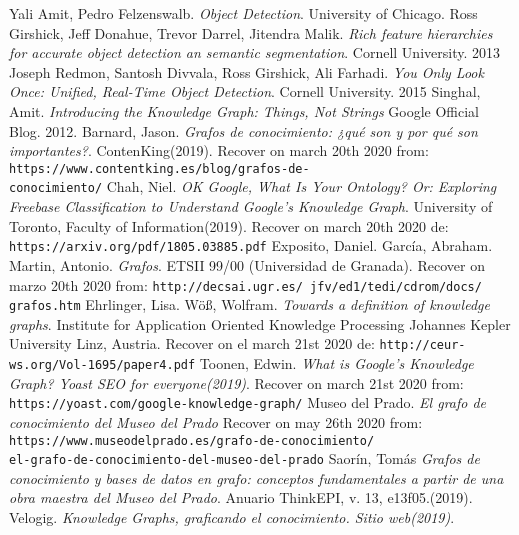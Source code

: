 \begin{thebibliography}{00}
  Yali Amit, Pedro Felzenswalb. \textit{Object Detection}. University of Chicago.
  Ross Girshick, Jeff Donahue, Trevor Darrel, Jitendra Malik.
  \textit{Rich feature hierarchies for accurate object detection an semantic
  segmentation}. Cornell University. 2013
  Joseph Redmon, Santosh Divvala, Ross Girshick, Ali Farhadi.
  \textit{You Only Look Once: Unified, Real-Time Object Detection}.
  Cornell University. 2015
  Singhal, Amit. \textit{Introducing the Knowledge Graph: Things, Not Strings}
  Google Official Blog. 2012.  
  Barnard, Jason. \textit{Grafos de conocimiento: ¿qué son y por qué son
  importantes?}. ContenKing(2019).
  Recover on  march 20th 2020 from:  \\
  \texttt{https://www.contentking.es/blog/grafos-de- \\conocimiento/}
  Chah, Niel. \textit{OK Google, What Is Your Ontology? Or: Exploring Freebase
  Classification to Understand Google’s Knowledge Graph}. University of Toronto,
  Faculty of Information(2019). Recover on  march 20th 2020 de:
  \texttt{https://arxiv.org/pdf/1805.03885.pdf}
  Exposito, Daniel. García, Abraham. Martin, Antonio. \textit{Grafos}.
  ETSII 99/00 (Universidad de Granada). Recover on marzo 20th 2020 from:
  \texttt{http://decsai.ugr.es/~jfv/ed1/tedi/cdrom/docs/ \\grafos.htm}
  Ehrlinger, Lisa. Wöß, Wolfram. \textit{Towards a definition of knowledge graphs}.
  Institute for Application Oriented Knowledge Processing Johannes Kepler
  University Linz, Austria. Recover on  el march 21st  2020 de:
  \texttt{http://ceur-ws.org/Vol-1695/paper4.pdf}
  Toonen, Edwin. \textit{What is Google’s Knowledge Graph? Yoast SEO for
  everyone(2019)}. Recover on march 21st 2020 from:
  \texttt{https://yoast.com/google-knowledge-graph/}
  Museo del Prado. \textit{El grafo de conocimiento del Museo del Prado}
  Recover on may 26th 2020 from:
  \texttt{https://www.museodelprado.es/grafo-de-conocimiento/
  \\el-grafo-de-conocimiento-del-museo-del-prado}
  Saorín, Tomás \textit{Grafos de conocimiento y bases de datos en grafo:
  conceptos fundamentales a partir de una obra maestra del Museo del Prado}.
  Anuario ThinkEPI, v. 13, e13f05.(2019).
  Velogig. \textit{Knowledge Graphs, graficando el conocimiento. Sitio web(2019)}.

\end{thebibliography}
